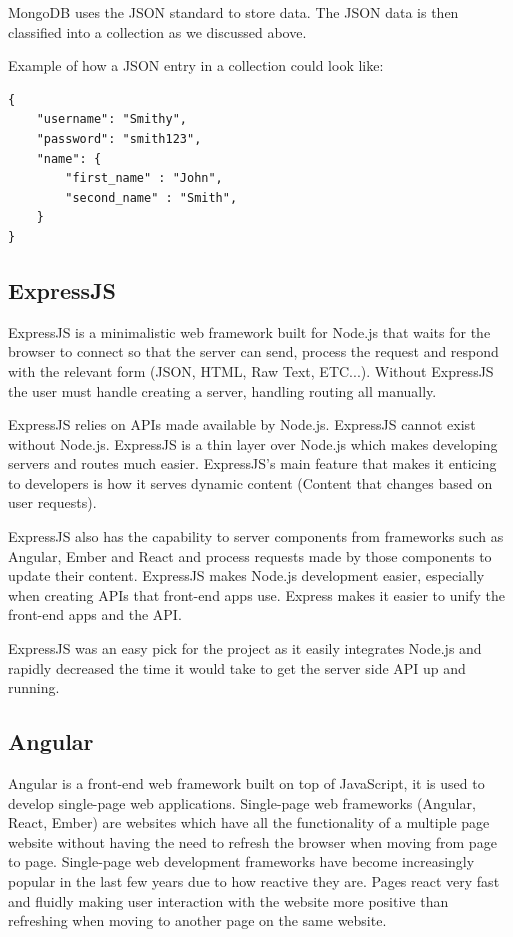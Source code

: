 MongoDB uses the JSON standard to store data. The JSON data is then classified into a collection as we discussed above. 

Example of how a JSON entry in a collection could look like:

\begin{verbatim}
{
    "username": "Smithy",
    "password": "smith123",
    "name": {
        "first_name" : "John",
        "second_name" : "Smith",
    }
}
\end{verbatim}

\subsection{ExpressJS}
ExpressJS is a minimalistic web framework built for Node.js that waits for the browser to connect so that the server can send, process the request and respond with the relevant form (JSON, HTML, Raw Text, ETC...). Without ExpressJS the user must handle creating a server, handling routing all manually.

ExpressJS relies on APIs made available by Node.js. ExpressJS cannot exist without Node.js. ExpressJS is a thin layer over Node.js which makes developing servers and routes much easier. ExpressJS's main feature that makes it enticing to developers is how it serves dynamic content (Content that changes based on user requests). 

ExpressJS also has the capability to server components from frameworks such as Angular, Ember and React and process requests made by those components to update their content. ExpressJS makes Node.js development easier, especially when creating APIs that front-end apps use. Express makes it easier to unify the front-end apps and the API.

ExpressJS was an easy pick for the project as it easily integrates Node.js and rapidly decreased the time it would take to get the server side API up and running. \cite{67301420130101}

\subsection{Angular}
Angular is a front-end web framework built on top of JavaScript, it is used to develop single-page web applications. Single-page web frameworks (Angular, React, Ember) are websites which have all the functionality of a multiple page website without having the need to refresh the browser when moving from page to page. Single-page web development frameworks have become increasingly popular in the last few years due to how reactive they are. Pages react very fast and fluidly making user interaction with the website more positive than refreshing when moving to another page on the same website. \cite{143077120160101}

